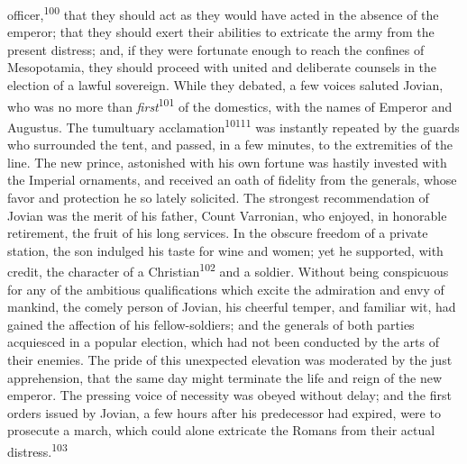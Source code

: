 officer,\textsuperscript{100} that they should act as they would have acted in the
absence of the emperor; that they should exert their abilities to
extricate the army from the present distress; and, if they were
fortunate enough to reach the confines of Mesopotamia, they
should proceed with united and deliberate counsels in the
election of a lawful sovereign. While they debated, a few voices
saluted Jovian, who was no more than \textit{first}\textsuperscript{101} of the
domestics, with the names of Emperor and Augustus. The tumultuary
acclamation\textsuperscript{10111} was instantly repeated by the guards who
surrounded the tent, and passed, in a few minutes, to the
extremities of the line. The new prince, astonished with his own
fortune was hastily invested with the Imperial ornaments, and
received an oath of fidelity from the generals, whose favor and
protection he so lately solicited. The strongest recommendation
of Jovian was the merit of his father, Count Varronian, who
enjoyed, in honorable retirement, the fruit of his long services.
In the obscure freedom of a private station, the son indulged his
taste for wine and women; yet he supported, with credit, the
character of a Christian\textsuperscript{102} and a soldier. Without being
conspicuous for any of the ambitious qualifications which excite
the admiration and envy of mankind, the comely person of Jovian,
his cheerful temper, and familiar wit, had gained the affection
of his fellow-soldiers; and the generals of both parties
acquiesced in a popular election, which had not been conducted by
the arts of their enemies. The pride of this unexpected elevation
was moderated by the just apprehension, that the same day might
terminate the life and reign of the new emperor. The pressing
voice of necessity was obeyed without delay; and the first orders
issued by Jovian, a few hours after his predecessor had expired,
were to prosecute a march, which could alone extricate the Romans
from their actual distress.\textsuperscript{103}




